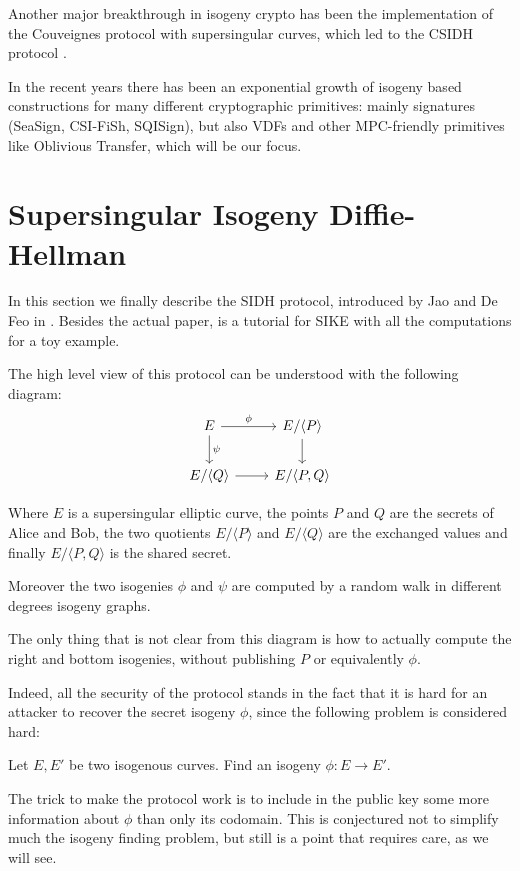 Another major breakthrough in isogeny crypto has been the implementation of the Couveignes protocol with supersingular curves, which led to the CSIDH protocol \cite{CSIDH}.

In the recent years there has been an exponential growth of isogeny based constructions for many different cryptographic primitives: mainly signatures (SeaSign, CSI-FiSh, SQISign), but also VDFs and other MPC-friendly primitives like Oblivious Transfer, which will be our focus.

\section{Supersingular Isogeny Diffie-Hellman}
In this section we finally describe the SIDH protocol, introduced by Jao and De Feo in \cite{SIDH11}. Besides the actual paper, \cite{Costello_SIKE} is a tutorial for SIKE with all the computations for a toy example.

The high level view of this protocol can be understood with the following diagram:
\[\begin{tikzcd}
E \rar["\phi"] \dar["\psi"] & E/\langle P\rangle \dar\\
E/\langle Q\rangle \rar & E/\langle P, Q\rangle
\end{tikzcd}\]

Where $E$ is a supersingular elliptic curve, the points $P$ and $Q$ are the secrets of Alice and Bob, the two quotients $E/\langle P\rangle$ and $E/\langle Q\rangle$ are the exchanged values and finally $E/\langle P, Q\rangle$ is the shared secret.

Moreover the two isogenies $\phi$ and $\psi$ are computed by a random walk in different degrees isogeny graphs.

The only thing that is not clear from this diagram is how to actually compute the right and bottom isogenies, without publishing $P$ or equivalently $\phi$.

Indeed, all the security of the protocol stands in the fact that it is hard for an attacker to recover the secret isogeny $\phi$, since the following problem is considered hard:
\begin{problem}
    Let $E,E'$ be two isogenous curves. Find an isogeny $\phi: E\to E'$.
\end{problem}

The trick to make the protocol work is to include in the public key some more information about $\phi$ than only its codomain. This is conjectured not to simplify much the isogeny finding problem, but still is a point that requires care, as we will see.

